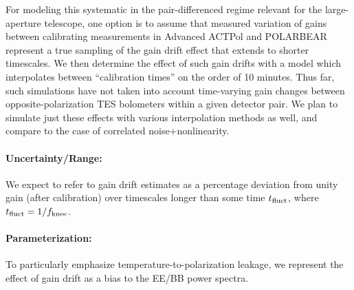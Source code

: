 For modeling this systematic in the pair-differenced regime relevant for the large-aperture telescope, one option is to assume that measured variation of gains between calibrating measurements in Advanced ACTPol and POLARBEAR represent a true sampling of the gain drift effect that extends to shorter timescales. We then determine the effect of such gain drifts with a model which interpolates between ``calibration times'' on the order of 10 minutes. Thus far, such simulations have not taken into account time-varying gain changes between opposite-polarization TES bolometers within a given detector pair. We plan to simulate just these effects with various interpolation methods as well, and compare to the case of correlated noise+nonlinearity.%

\paragraph{Uncertainty/Range:}
We expect to refer to gain drift estimates as a percentage deviation from unity gain (after calibration) over timescales longer than some time $t_{\mbox{\scriptsize fluct}}$, where $t_{\mbox{\scriptsize fluct}} = 1 / f_{\mbox{\scriptsize knee}}$.

\paragraph{Parameterization:}
To particularly emphasize temperature-to-polarization leakage, we represent the effect of gain drift as a bias to the EE/BB power spectra.
